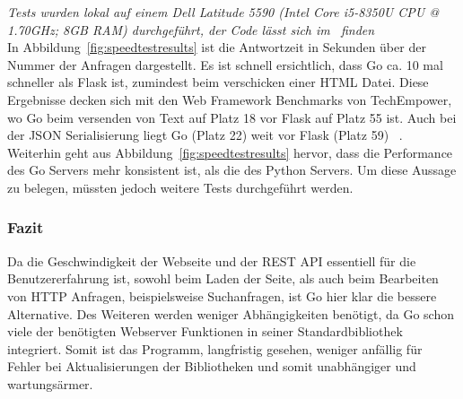 \textit{Tests wurden lokal auf einem Dell Latitude 5590 (Intel Core i5-8350U CPU
@ 1.70GHz; 8GB RAM) durchgeführt, der Code lässt sich im~ finden} \\[2ex]

In Abbildung~\ref{fig:speedtestresults} ist die Antwortzeit in Sekunden über der Nummer 
der Anfragen dargestellt. Es ist schnell ersichtlich, dass Go ca. 10 mal schneller
als Flask ist, zumindest beim verschicken einer HTML Datei. Diese Ergebnisse 
decken sich mit den Web Framework Benchmarks von TechEmpower, wo Go beim 
versenden von Text auf Platz 18 vor Flask auf Platz 55 ist. Auch bei der 
\gls{JSON} Serialisierung liegt Go (Platz 22) weit vor Flask (Platz 59)
~\cite{Tec21}. Weiterhin geht aus Abbildung~\ref{fig:speedtestresults} hervor, 
dass die Performance des Go Servers mehr konsistent ist, als die des Python Servers. 
Um diese Aussage zu belegen, müssten jedoch weitere Tests durchgeführt werden.\\

\subsubsection{Fazit}
Da die Geschwindigkeit der Webseite und der \gls{REST} \gls{API} essentiell für 
die Benutzererfahrung ist, sowohl beim Laden der Seite, als auch beim Bearbeiten
von \gls{HTTP} Anfragen, beispielsweise Suchanfragen, ist Go hier klar die
bessere Alternative. Des Weiteren werden weniger Abhängigkeiten benötigt, da
Go schon viele der benötigten Webserver Funktionen in seiner Standardbibliothek integriert.
Somit ist das Programm, langfristig gesehen, weniger anfällig für Fehler bei 
Aktualisierungen der Bibliotheken und somit unabhängiger und wartungsärmer.

\newpage